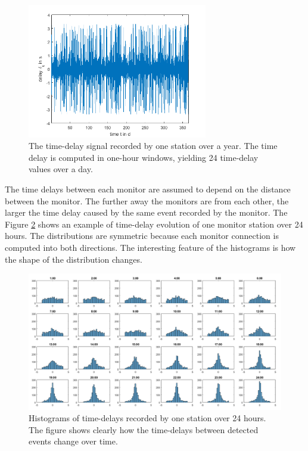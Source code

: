 \documentclass[12pt,a4paper,english]{article}
\begin{document}
\begin{figure}[ht]
  \begin{center}   
   \includegraphics[width=0.7\textwidth]{delayevolutionovertimeforonestation2.png}
  \end{center}
  \caption{The time-delay signal recorded by one station over a year. The time delay is computed in one-hour windows, yielding 24 time-delay values over a day.}\label{fig:examplesignal}
\end{figure}

The time delays between each monitor are assumed to depend on the distance between the monitor. The further away the monitors are from each other, the larger the time delay caused by the same event recorded by the monitor. The Figure \ref{fig:histograms} shows an example of time-delay evolution of one monitor station over 24 hours. The distributions  are symmetric because each monitor connection is computed into both directions. The interesting feature of the histograms is how the shape of the distribution changes. 

\begin{figure}[ht]
  \begin{center}   
   \includegraphics[width=\textwidth]{hourlydelaydistributionoverallstationsforoneday.png}
  \end{center}
  \caption{Histograms of time-delays recorded by one station over 24 hours. The figure shows clearly how the time-delays between detected events change over time.}\label{fig:histograms}
\end{figure}
\end{document}
